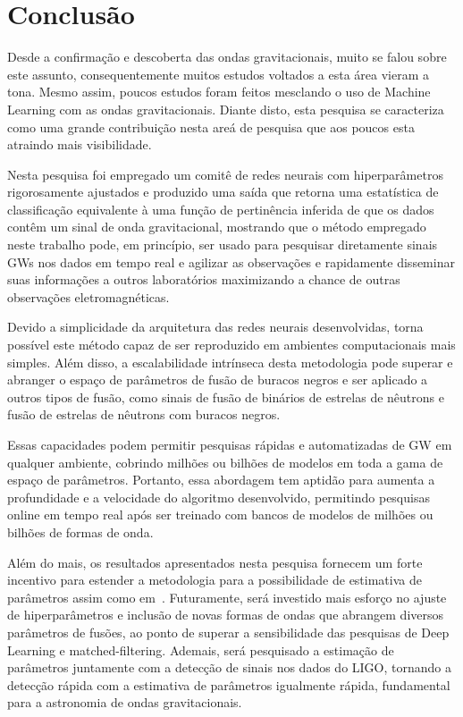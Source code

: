 \chapter{Conclusão}

Desde a confirmação e descoberta das ondas gravitacionais, muito se falou sobre este assunto, consequentemente muitos estudos voltados a esta área vieram a tona. Mesmo assim, poucos estudos foram feitos mesclando o uso de Machine Learning com as ondas gravitacionais. Diante disto, esta pesquisa se caracteriza como uma grande contribuição nesta areá de pesquisa que aos poucos esta atraindo mais visibilidade. 

Nesta pesquisa foi empregado um comitê de redes neurais com hiperparâmetros rigorosamente ajustados e produzido uma saída que retorna uma estatística de classificação equivalente à uma função de pertinência inferida de que os dados contêm um sinal de onda gravitacional, mostrando que o método empregado neste trabalho pode, em princípio, ser usado para pesquisar diretamente sinais GWs nos dados em tempo real e agilizar as observações e rapidamente disseminar suas informações a outros laboratórios  maximizando a chance de outras observações eletromagnéticas.

Devido a simplicidade da arquitetura das redes neurais desenvolvidas, torna possível este método capaz de ser reproduzido em ambientes computacionais mais simples. Além disso, a escalabilidade intrínseca desta metodologia pode superar e abranger o espaço de parâmetros de fusão de buracos negros e ser aplicado a outros tipos de fusão, como sinais de fusão de binários de estrelas de nêutrons e fusão de estrelas de nêutrons com buracos negros. 

Essas capacidades podem permitir pesquisas rápidas e automatizadas de GW em qualquer ambiente, cobrindo milhões ou bilhões de modelos em toda a gama de espaço de parâmetros. Portanto, essa abordagem tem aptidão para aumenta a profundidade e a velocidade do algoritmo desenvolvido, permitindo pesquisas online em tempo real após ser treinado com bancos de modelos de milhões ou bilhões de formas de onda.

Além do mais, os resultados apresentados nesta pesquisa fornecem um forte incentivo para estender a metodologia para a possibilidade de estimativa de parâmetros assim como em~\cite{PhysRevD.97.044039,GEORGE201864}. Futuramente, será investido mais esforço no ajuste de hiperparâmetros e inclusão de novas formas de ondas que abrangem diversos parâmetros de fusões, ao ponto de superar a sensibilidade das pesquisas de Deep Learning e matched-filtering. Ademais, será pesquisado a estimação de parâmetros juntamente com a detecção de sinais nos dados do LIGO, tornando a detecção rápida com a estimativa de parâmetros igualmente rápida, fundamental para a astronomia de ondas gravitacionais.

